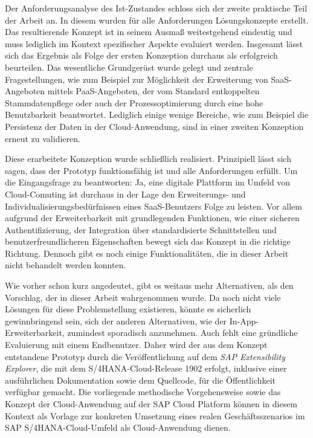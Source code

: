 Der Anforderungsanalyse des Ist-Zustandes schloss sich der zweite praktische Teil der Arbeit an. In diesem wurden für alle Anforderungen Lösungskonzepte erstellt. Das resultierende Konzept ist in seinem Ausmaß weitestgehend eindeutig und muss lediglich im Kontext spezifischer Aspekte evaluiert werden. Insgesamt lässt sich das Ergebnis als Folge der ersten Konzeption durchaus als erfolgreich beurteilen. Das wesentliche Grundgerüst wurde gelegt und zentrale Fragestellungen, wie zum Beispiel zur Möglichkeit der Erweiterung von \ac{SaaS}-Angeboten mittels \ac{PaaS}-Angeboten, der vom Standard entkoppelten Stammdatenpflege oder auch der Prozessoptimierung durch eine hohe Benutzbarkeit beantwortet. Lediglich einige wenige Bereiche, wie zum Beispiel die Persistenz der Daten in der Cloud-Anwendung, sind in einer zweiten Konzeption erneut zu validieren.

Diese erarbeitete Konzeption wurde schließlich realisiert. Prinzipiell lässt sich sagen, dass der Prototyp funktionsfähig ist und alle Anforderungen erfüllt. Um die Eingangsfrage zu beantworten: Ja, eine digitale Plattform im Umfeld von Cloud-Comuting ist durchaus in der Lage den Erweiterungs- und Individualisierungsbedürfnissen eines \ac{SaaS}-Benutzers Folge zu leisten. Vor allem aufgrund der Erweiterbarkeit mit grundlegenden Funktionen, wie einer sicheren Authentifizierung, der Integration über standardisierte Schnittstellen und benutzerfreundlicheren Eigenschaften bewegt sich das Konzept in die richtige Richtung. Dennoch gibt es noch einige Funktionalitäten, die in dieser Arbeit nicht behandelt werden konnten.

Wie vorher schon kurz angedeutet, gibt es weitaus mehr Alternativen, als den Vorschlag, der in dieser Arbeit wahrgenommen wurde. Da noch nicht viele Lösungen für diese Problemstellung existieren, könnte es sicherlich gewinnbringend sein, sich der anderen Alternativen, wie der In-App-Erweiterbarkeit, zumindest sporadisch anzunehmen. Auch fehlt eine gründliche Evaluierung mit einem Endbenutzer. Daher wird der aus dem Konzept entstandene Prototyp durch die Veröffentlichung auf dem \textit{SAP Extensibility Explorer}, die mit dem S/4HANA-Cloud-Release 1902 erfolgt, inklusive einer ausführlichen Dokumentation sowie dem Quellcode, für die Öffentlichkeit verfügbar gemacht. Die vorliegende methodische Vorgehensweise sowie das Konzept der Cloud-Anwendung auf der SAP Cloud Platform können in diesem Kontext als Vorlage zur konkreten Umsetzung eines realen Geschäftsszenarios im SAP S/4HANA-Cloud-Umfeld als Cloud-Anwendung dienen. 

